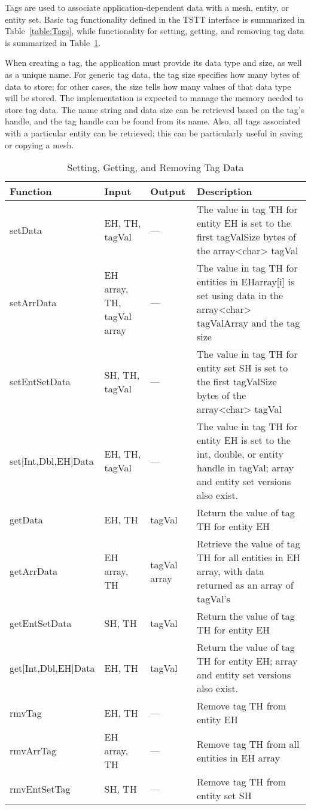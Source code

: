 Tags are used to associate application-dependent data with a mesh,
entity, or entity set.  Basic tag functionality defined in the TSTT
interface is summarized in Table~\ref{table:Tags}, while functionality
for setting, getting, and removing tag data is summarized in
Table~\ref{table:Tags2}.

When creating a tag, the application must provide its data type and
size, as well as a unique name. For generic tag data, the tag size
specifies how many bytes of data to store; for other cases, the size
tells how many values of that data type will be stored.  The
implementation is expected to manage the memory needed to store tag
data. The name string and data size can be retrieved based on the tag's
handle, and the tag handle can be found from its name. Also, all tags
associated with a particular entity can be retrieved; this can be
particularly useful in saving or copying a mesh.

\begin{table}[tbp]
\caption{Setting, Getting, and Removing Tag Data}\label{table:Tags2}
{\small
\begin{tabular}{|p{1.25in}|p{0.75in}|p{0.75in}|p{223pt}|}
\hline 
Function&
Input&
Output&
Description\tabularnewline
\hline
\hline 
setData&
EH, TH, tagVal&
---&
The value in tag TH for entity EH is set to the first tagValSize bytes
of the array<char> tagVal\tabularnewline
\hline 
setArrData&
EH array, TH, tagVal array&
---&
The value in tag TH for entities in EHarray{[}i{]} is set using data
in the array<char> tagValArray and the tag size\tabularnewline
\hline 
setEntSetData&
SH, TH, tagVal&
---&
The value in tag TH for entity set SH is set to the first tagValSize
bytes of the array<char> tagVal\tabularnewline
\hline 
set{[}Int,Dbl,EH{]}Data&
EH, TH, tagVal&
---&
The value in tag TH for entity EH is set to the int, double, or entity
handle in tagVal; array and entity set versions also exist.\tabularnewline
\hline 
\hline 
getData&
EH, TH&
tagVal&
Return the value of tag TH for entity EH\tabularnewline
\hline 
getArrData&
EH array, TH&
tagVal array&
Retrieve the value of tag TH for all entities in EH array, with data
returned as an array of tagVal's\tabularnewline
\hline 
getEntSetData&
SH, TH&
tagVal&
Return the value of tag TH for entity EH\tabularnewline
\hline 
get{[}Int,Dbl,EH{]}Data&
EH, TH&
tagVal&
Return the value of tag TH for entity EH; array and entity set versions
also exist.\tabularnewline
\hline
\hline 
rmvTag&
EH, TH&
---&
Remove tag TH from entity EH\tabularnewline
\hline 
rmvArrTag&
EH array, TH&
---&
Remove tag TH from all entities in EH array\tabularnewline
\hline 
rmvEntSetTag&
SH, TH&
---&
Remove tag TH from entity set SH\tabularnewline
\hline
\end{tabular}
}
\end{table}

